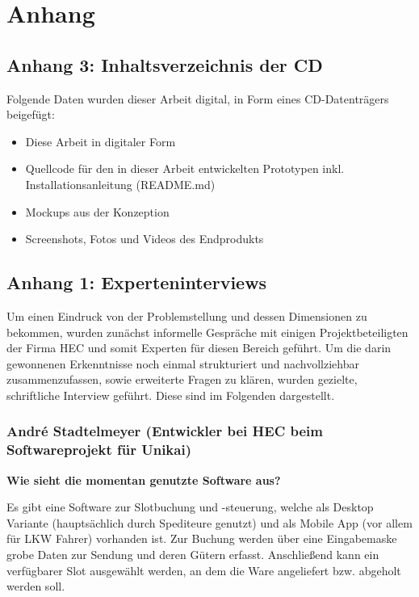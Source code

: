 \section*{Anhang}
\renewcommand{\leftmark}{Anhang}

\subsection*{Anhang 3: Inhaltsverzeichnis der CD}
%
\label{appendix:digital}

Folgende Daten wurden dieser Arbeit digital, in Form eines CD-Datenträgers beigefügt:

\begin{itemize}
    \item Diese Arbeit in digitaler Form
    \item Quellcode für den in dieser Arbeit entwickelten Prototypen inkl. Installationsanleitung (README.md)
    \item Mockups aus der Konzeption
    \item Screenshots, Fotos und Videos des Endprodukts
\end{itemize}


\subsection*{Anhang 1: Experteninterviews}
\label{sec:appendixInterviews}

Um einen Eindruck von der Problemstellung und dessen Dimensionen zu bekommen, wurden zunächst informelle Gespräche mit einigen Projektbeteiligten der Firma HEC und somit Experten für diesen Bereich geführt. Um die darin gewonnenen Erkenntnisse noch einmal strukturiert und nachvollziehbar zusammenzufassen, sowie erweiterte Fragen zu klären, wurden gezielte, schriftliche Interview geführt. Diese sind im Folgenden dargestellt. 

\subsubsection*{André Stadtelmeyer (Entwickler bei HEC beim Softwareprojekt für Unikai)}

\textbf{Wie sieht die momentan genutzte Software aus?}

Es gibt eine Software zur Slotbuchung und -steuerung, welche als Desktop Variante (hauptsächlich durch Spediteure genutzt) und als Mobile App (vor allem für LKW Fahrer) vorhanden ist. Zur Buchung werden über eine Eingabemaske grobe Daten zur Sendung und deren Gütern erfasst. Anschließend kann ein verfügbarer Slot ausgewählt werden, an dem die Ware angeliefert bzw. abgeholt werden soll.

